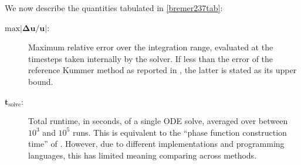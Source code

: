 \documentclass[10pt]{article}
\begin{document}
We now describe the quantities tabulated in \cref{bremer237tab}:
\begin{description}
    \item[$\bm{\mathrm{max}|\Delta u/u|}$:]{Maximum relative error over the
        integration range, evaluated at the timesteps taken internally by the
        solver. If less than the error of the reference Kummer method
    as reported in \cite[Table~1]{bremer2018}, the latter is stated as its upper bound.}
    \item[$\bm{t_{\mathrm{solve}}}$:]{Total runtime, in seconds, of a single
        ODE solve, averaged over between $10^3$ and $10^5$ runs. This is equivalent to the
        ``phase function construction time'' of
        \cite[Table~1]{bremer2018}.
        However, due to different implementations and programming languages,
        this has limited meaning comparing across methods.}
      

\end{description}
\end{document}

